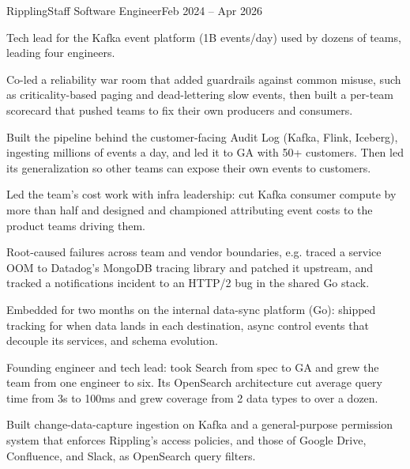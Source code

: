 \documentclass{resume}
\begin{document}



\begin{role}{Rippling}{Staff Software Engineer}{Feb 2024 -- Apr 2026}
\item {} Tech lead for the Kafka event platform (1B events/day) used by dozens of teams, leading four engineers.
\item Co-led a reliability war room that added guardrails against common misuse, such as criticality-based paging and \mbox{dead-lettering} slow events, then built a per-team scorecard that pushed teams to fix their own producers and consumers.
\item Built the pipeline behind the customer-facing Audit Log (Kafka, Flink, Iceberg), ingesting millions of events a day, and led it to GA with 50+ customers. Then led its generalization so other teams can expose their own events to customers.
\item Led the team's cost work with infra leadership: cut Kafka consumer compute by more than half and designed and championed attributing event costs to the product teams driving them.
\item Root-caused failures across team and vendor boundaries, e.g. traced a service OOM to Datadog's MongoDB tracing library and patched it upstream, and tracked a notifications incident to an HTTP/2 bug in the shared Go stack.
\item {} Embedded for two months on the internal data-sync platform (Go): shipped tracking for when data lands in each destination, async control events that decouple its services, and schema evolution.
\item {} Founding engineer and tech lead: took Search from spec to GA and grew the team from one engineer to six. Its OpenSearch architecture cut average query time from 3s to 100ms and grew coverage from 2 data types to over a dozen.
\item Built change-data-capture ingestion on Kafka and a general-purpose permission system that enforces Rippling's access policies, and those of Google Drive, Confluence, and Slack, as OpenSearch query filters.

\end{role}
\end{document}
